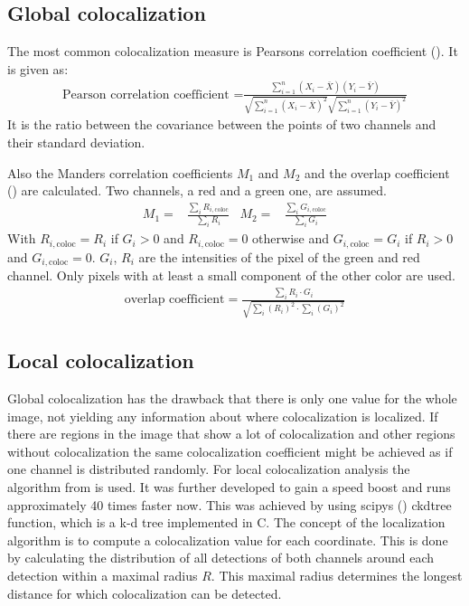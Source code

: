 \subsection{Global colocalization}
The most common colocalization measure is Pearsons correlation coefficient (\cite{pearson}). It is given as:
\begin{align}
\text{Pearson correlation coefficient =}\frac{\sum ^n _{i=1}(X_i - \bar{X})(Y_i - \bar{Y})}{\sqrt{\sum ^n _{i=1}(X_i - \bar{X})^2} \sqrt{\sum ^n _{i=1}(Y_i - \bar{Y})^2}}
\end{align}
It is the ratio between the covariance between the points of two channels and their standard deviation.\newline

Also the Manders correlation coefficients $M_1$ and $M_2$ and the overlap coefficient (\cite{manders}) are calculated. Two channels, a red and a green one, are assumed.
\begin{align}
M_1 =& \frac{\sum_i R_{i,\text{coloc}}}{\sum_i R_i}&M_2 = & \frac{\sum_i G_{i,\text{coloc}}}{\sum_i G_i}
\end{align}
With $R_{i,\text{coloc}} = R_i$ if $G_i >0$ and $R_{i,\text{coloc}} = 0$ otherwise and $G_{i,\text{coloc}} = G_i$ if $R_i >0$ and $G_{i,\text{coloc}} = 0$. $G_i$, $R_i$ are the intensities of the pixel of the green and red channel. Only pixels with at least a small component of the other color are used.
\begin{align}
\text{overlap coefficient} = \frac{\sum_i R_i \cdot G_i}{\sqrt{\sum_i \left(R_i\right)^2 \cdot \sum_i \left(G_i\right)^2}}
\end{align}

\subsection{Local colocalization}
Global colocalization has the drawback that there is only one value for the whole image, not yielding any information about where colocalization is localized. If there are regions in the image that show a lot of colocalization and other regions without colocalization the same colocalization coefficient might be achieved as if one channel is distributed randomly.\newline
For local colocalization analysis the algorithm from \cite{coloc} is used. It was further developed to gain a speed boost and runs approximately 40 times faster now. This was achieved by using scipys (\cite{scipy}) ckdtree function, which is a k-d tree implemented in C.\newline
The concept of the localization algorithm is to compute a colocalization value for each coordinate. This is done by calculating the distribution of all detections of both channels around each detection within a maximal radius $R$. This maximal radius determines the longest distance for which colocalization can be detected.\newline

